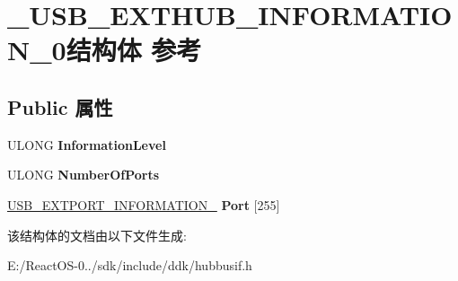 \hypertarget{struct___u_s_b___e_x_t_h_u_b___i_n_f_o_r_m_a_t_i_o_n__0}{}\section{\+\_\+\+U\+S\+B\+\_\+\+E\+X\+T\+H\+U\+B\+\_\+\+I\+N\+F\+O\+R\+M\+A\+T\+I\+O\+N\+\_\+0结构体 参考}
\label{struct___u_s_b___e_x_t_h_u_b___i_n_f_o_r_m_a_t_i_o_n__0}
\subsection*{Public 属性}
\begin{DoxyCompactItemize}
\item 
\mbox{\label{struct___u_s_b___e_x_t_h_u_b___i_n_f_o_r_m_a_t_i_o_n__0_a68df3fafde819f27b403b29281fb817e}} 
U\+L\+O\+NG {\bfseries Information\+Level}
\item 
\mbox{\label{struct___u_s_b___e_x_t_h_u_b___i_n_f_o_r_m_a_t_i_o_n__0_ac0ae591e4e6502a3b6223dace346e069}} 
U\+L\+O\+NG {\bfseries Number\+Of\+Ports}
\item 
\mbox{\label{struct___u_s_b___e_x_t_h_u_b___i_n_f_o_r_m_a_t_i_o_n__0_a0817e4e32a8d5a3fd118b72cfdbfd32f}} 
\hyperlink{struct___u_s_b___e_x_t_p_o_r_t___i_n_f_o_r_m_a_t_i_o_n__0}{U\+S\+B\+\_\+\+E\+X\+T\+P\+O\+R\+T\+\_\+\+I\+N\+F\+O\+R\+M\+A\+T\+I\+O\+N\+\_} {\bfseries Port} \mbox{[}255\mbox{]}
\end{DoxyCompactItemize}


该结构体的文档由以下文件生成\+:\begin{DoxyCompactItemize}
\item 
E\+:/\+React\+O\+S-\/0../sdk/include/ddk/hubbusif.\+h\end{DoxyCompactItemize}
